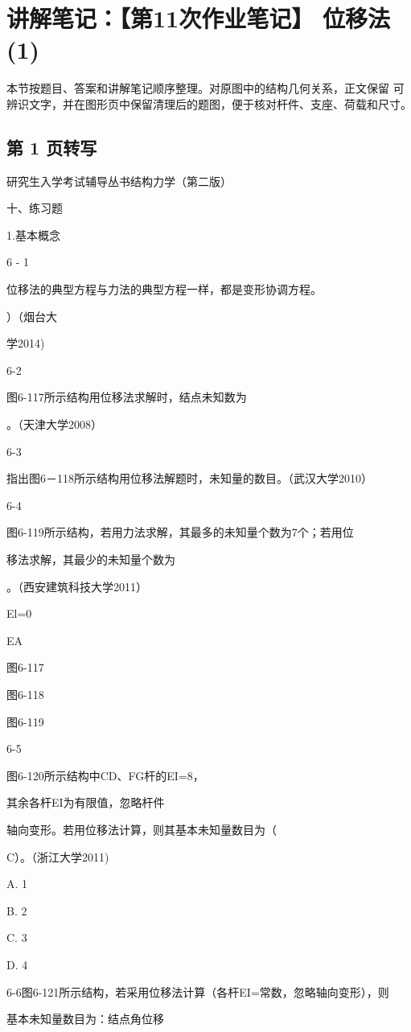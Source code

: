 \section{讲解笔记：【第11次作业笔记】 位移法(1)}
\begin{analysisbox}
本节按题目、答案和讲解笔记顺序整理。对原图中的结构几何关系，正文保留 可辨识文字，并在图形页中保留清理后的题图，便于核对杆件、支座、荷载和尺寸。
\end{analysisbox}
\subsection*{第 1 页转写}
研究生入学考试辅导丛书结构力学（第二版）

十、练习题

1.基本概念

6 - 1

位移法的典型方程与力法的典型方程一样，都是变形协调方程。

）（烟台大

学2014)

6-2

图6-117所示结构用位移法求解时，结点未知数为

。（天津大学2008）

6-3

指出图6－118所示结构用位移法解题时，未知量的数目。（武汉大学2010）

6-4

图6-119所示结构，若用力法求解，其最多的未知量个数为7个；若用位

移法求解，其最少的未知量个数为

。（西安建筑科技大学2011）

El=0

EA

图6-117

图6-118

图6-119

6-5

图6-120所示结构中CD、FG杆的EI=8，

其余各杆EI为有限值，忽略杆件

轴向变形。若用位移法计算，则其基本未知量数目为（

C）。（浙江大学2011)

A. 1

B. 2

C. 3

D. 4

6-6图6-121所示结构，若采用位移法计算（各杆EI=常数，忽略轴向变形），则

基本未知量数目为：结点角位移

